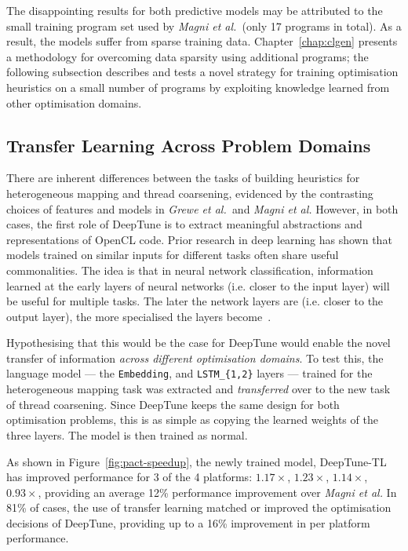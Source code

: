 The disappointing results for both predictive models may be attributed to the small training program set used by \emph{Magni et al.\ }(only 17 programs in total). As a result, the models suffer from sparse training data. Chapter~\ref{chap:clgen} presents a methodology for overcoming data sparsity using additional programs; the following subsection describes and tests a novel strategy for training optimisation heuristics on a small number of programs by exploiting knowledge learned from other optimisation domains.


\subsection{Transfer Learning Across Problem Domains}
\label{subsec:deeptune-transfer-learning}

There are inherent differences between the tasks of building heuristics for heterogeneous mapping and thread coarsening, evidenced by the contrasting choices of features and models in \emph{Grewe et al.\ }and \emph{Magni et al.} However, in both cases, the first role of DeepTune is to extract meaningful abstractions and representations of OpenCL code. Prior research in deep learning has shown that models trained on similar inputs for different tasks often share useful commonalities. The idea is that in neural network classification, information learned at the early layers of neural networks (i.e. closer to the input layer) will be useful for multiple tasks. The later the network layers are (i.e. closer to the output layer), the more specialised the layers become~\cite{Zeiler2014}.

Hypothesising that this would be the case for DeepTune would enable the novel transfer of information \emph{across different optimisation domains}. To test this, the language model --- the \texttt{Embedding}, and \texttt{LSTM\_\{1,2\}} layers --- trained for the heterogeneous mapping task was extracted and \emph{transferred} over to the new task of thread coarsening. Since DeepTune keeps the same design for both optimisation problems, this is as simple as copying the learned weights of the three layers. The model is then trained as normal.

As shown in Figure~\ref{fig:pact-speedup}, the newly trained model, DeepTune-TL has improved performance for 3 of the 4 platforms: $1.17\times$, $1.23\times$, $1.14\times$, $0.93\times$, providing an average 12\% performance improvement over \emph{Magni et al.}  In 81\% of cases, the use of transfer learning matched or improved the optimisation decisions of DeepTune, providing up to a 16\% improvement in per platform performance.

